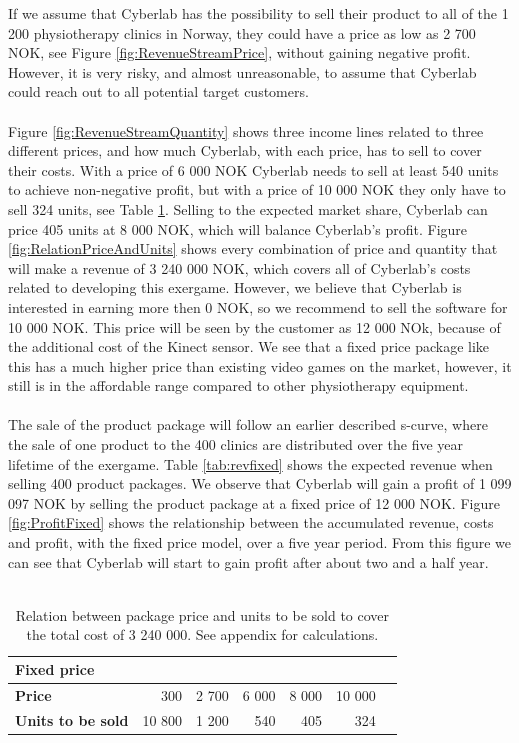 If we assume that Cyberlab has the possibility to sell their product to all of the 1 200 physiotherapy clinics in Norway, they could have a price as low as 2 700 NOK, see Figure \ref{fig:RevenueStreamPrice}, without gaining negative profit. However, it is very risky, and almost unreasonable, to assume that Cyberlab could reach out to all potential target customers. \\ \\
Figure \ref{fig:RevenueStreamQuantity} shows three income lines related to three different prices, and how much Cyberlab, with each price, has to sell to cover their costs. With a price of 6 000 NOK Cyberlab needs to sell at least 540 units to achieve non-negative profit, but with a price of 10 000 NOK they only have to sell 324 units, see Table \ref{tab:unitsfixed}. Selling to the expected market share, Cyberlab can price 405 units at 8 000 NOK, which will balance Cyberlab's profit. Figure \ref{fig:RelationPriceAndUnits} shows every combination of price and quantity that will make a revenue of 3 240 000 NOK, which covers all of Cyberlab's costs related to developing this exergame. However, we believe that Cyberlab is interested in earning more then 0 NOK, so we recommend to sell the software for 10 000 NOK. This price will be seen by the customer as 12 000 NOk, because of the additional cost of the Kinect sensor. We see that a fixed price package like this has a much higher price than existing video games on the market, however, it still is in the affordable range compared to other physiotherapy equipment. \\ \\
The sale of the product package will follow an earlier described s-curve, where the sale of one product to the 400 clinics are distributed over the five year lifetime of the exergame. Table \ref{tab:revfixed} shows the expected revenue when selling 400 product packages. We observe that Cyberlab will gain a profit of 1 099 097 NOK by selling the product package at a fixed price of 12 000 NOK. Figure \ref{fig:ProfitFixed} shows the relationship between the accumulated revenue, costs and profit, with the fixed price model, over a five year period. From this figure we can see that Cyberlab will start to gain profit after about two and a half year. \\ \\
\begin{table}
\centering
\caption[Price and Unit examples with the fixed price model]{Relation between package price and units to be sold to cover the total cost of 3 240 000. See appendix for calculations.}
    \begin{tabular}{|l|r|r|r|r|r|r|}
        \hline
       \textbf{Fixed price}  & & & & & \\ \hline
      \textbf{Price} & 300 & 2 700 & 6 000 & 8 000 & 10 000 \\ \hline
	   \textbf{Units to be sold} & 10 800 & 1 200 & 540 & 405 & 324 \\ \hline	
    \end{tabular}
    \label{tab:unitsfixed}
\end{table}

